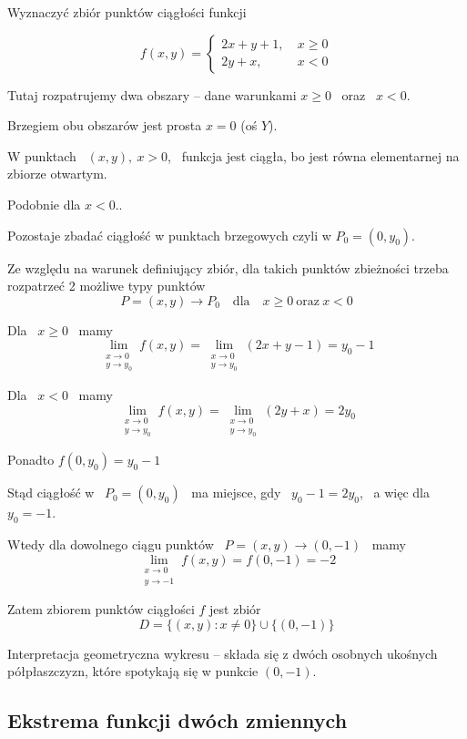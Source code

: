 Wyznaczyć zbiór punktów ciągłości funkcji

$$ f(x,y) = \left\{ \begin{aligned} 2x + y + 1, & \ x \geq 0 \\ 2y + x, & \ x < 0 \end{aligned} \right. $$

Tutaj rozpatrujemy dwa obszary -- dane warunkami $ x \geq 0 $ \ oraz \ $x < 0$.

Brzegiem obu obszarów jest prosta $ x = 0 $ (oś $Y$).

W punktach \ $ (x,y), \ x > 0 $, \ funkcja jest ciągła, bo jest równa elementarnej na zbiorze otwartym.

Podobnie dla $ x < 0 $..

Pozostaje zbadać ciągłość w punktach brzegowych czyli w $ P_0  = (0, y_0) $.

Ze względu na warunek definiujący zbiór, dla takich punktów zbieżności trzeba rozpatrzeć 2 możliwe typy punktów
$$ P = (x,y) \to P_0 \quad \textrm{dla} \quad x \geq 0 \ \textrm{oraz} \ x < 0 $$

Dla \ $ x \geq 0 $ \ mamy
$$ \lim_{\substack{x \to 0 \\ y \to y_0}} f(x,y) = \lim_{\substack{x \to 0 \\ y \to y_0}} (2x + y - 1) = y_0 - 1 $$

Dla \ $ x < 0 $ \ mamy
$$ \lim_{\substack{x \to 0 \\ y \to y_0}} f(x,y) = \lim_{\substack{x \to 0 \\ y \to y_0}} (2y + x) = 2y_0 $$

Ponadto $ f(0,y_0) = y_0 - 1 $

Stąd ciągłość w \ $ P_0 = (0,y_0) $ \ ma miejsce, gdy \ $ y_0 - 1 = 2y_0 $, \ a więc dla \ $ y_0 = -1$.

Wtedy dla dowolnego ciągu punktów \ $ P = (x,y) \to (0, -1) $ \ mamy
$$ \lim_{\substack{x \to 0 \\ y \to -1}} f(x,y) = f(0,-1) = -2 $$

Zatem zbiorem punktów ciągłości $f$ jest zbiór
$$ D = \{ (x,y) : x \neq 0 \} \cup \{ (0,-1) \} $$

Interpretacja geometryczna wykresu -- składa się z dwóch osobnych ukośnych półpłaszczyzn, które spotykają
się w punkcie $(0, -1) $.


\subsection*{Ekstrema funkcji dwóch zmiennych}

